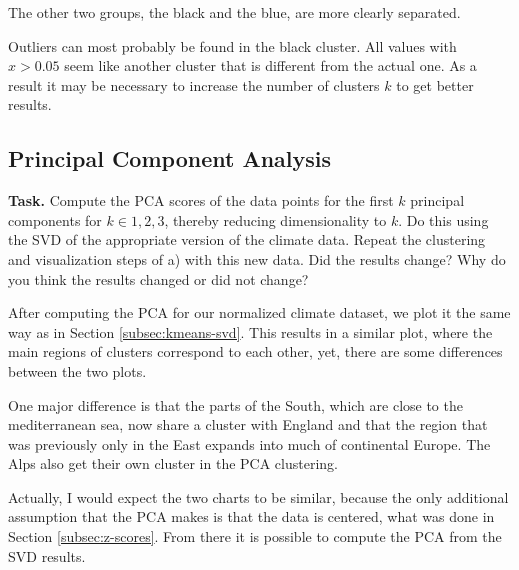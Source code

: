 \documentclass{support/acm_proc_article-sp}
\begin{document}
    The other two groups, the black and the blue, are more clearly separated.

    Outliers can most probably be found in the black cluster.
    All values with $x > 0.05$ seem like another cluster that is different from the actual one.
    As a result it may be necessary to increase the number of clusters $k$ to get better results.


    \subsection{Principal Component Analysis}

    \textbf{Task.} Compute the PCA scores of the data points for the first $k$ principal components for $k \in { 1, 2, 3 }$,
    thereby reducing dimensionality to $k$.
    Do this using the SVD of the appropriate version of the climate data.
    Repeat the clustering and visualization steps of a) with this new data.
    Did the results change?
    Why do you think the results changed or did not change?

    After computing the PCA for our normalized climate dataset, we plot it the same way as in Section \ref{subsec:kmeans-svd}.
    This results in a similar plot, where the main regions of clusters correspond to each other, yet, there are some
    differences between the two plots.

    One major difference is that the parts of the South, which are close to the mediterranean sea, now share a cluster with
    England and that the region that was previously only in the East expands into much of continental Europe.
    The Alps also get their own cluster in the PCA clustering.

    Actually, I would expect the two charts to be similar, because the only additional assumption that the PCA makes is
    that the data is centered, what was done in Section \ref{subsec:z-scores}.
    From there it is possible to compute the PCA from the SVD results.


    
    
\end{document}
